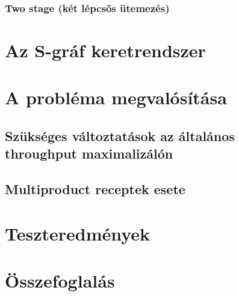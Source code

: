\documentclass [12pt]{report}
\begin{document}
\subsection{Two stage (két lépcsős ütemezés)}
\chapter{Az S-gráf keretrendszer}
\chapter{A probléma megvalósítása}
\section{Szükséges változtatások az általános throughput maximalizálón} \label{refactor}
\section{Multiproduct receptek esete} \label{extended_multiproduct}
\chapter{Teszteredmények}
\chapter{Összefoglalás}
\end{document}
